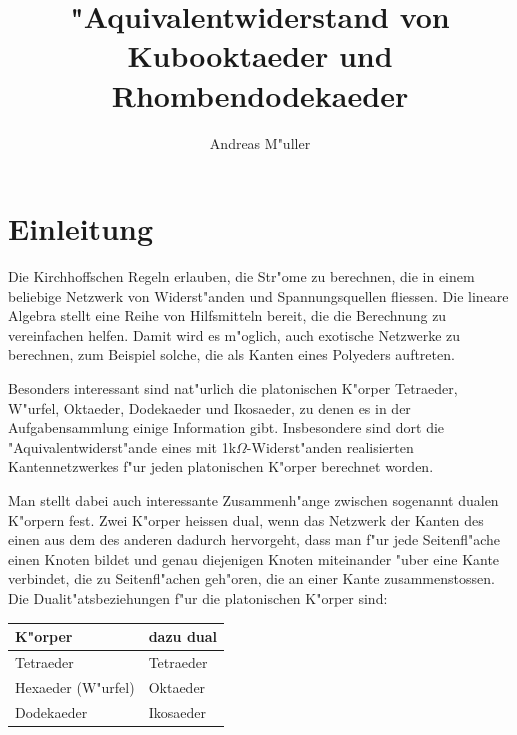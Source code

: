 \documentclass[a4paper,12pt]{article}
\begin{document}
\title{"Aquivalentwiderstand von Kubooktaeder und Rhombendodekaeder}
\author{Andreas M"uller}
\date{}
\maketitle
\section{Einleitung}
Die Kirchhoffschen Regeln erlauben, die Str"ome zu berechnen,
die in einem beliebige Netzwerk von Widerst"anden und Spannungsquellen fliessen.
Die lineare Algebra stellt eine Reihe von Hilfsmitteln bereit, die
die Berechnung zu vereinfachen helfen.
Damit wird es m"oglich, auch exotische Netzwerke zu berechnen, zum Beispiel
solche, die als Kanten eines Polyeders auftreten.

Besonders interessant sind nat"urlich die platonischen K"orper Tetraeder, W"urfel,
Oktaeder, Dodekaeder und Ikosaeder, zu denen es in der Aufgabensammlung
einige Information gibt.
Insbesondere sind dort die "Aquivalentwiderst"ande eines mit
1k$\Omega$-Widerst"anden realisierten Kantennetzwerkes f"ur jeden 
platonischen K"orper berechnet worden.

Man stellt dabei auch interessante Zusammenh"ange zwischen sogenannt dualen
K"orpern fest.
Zwei K"orper heissen dual, wenn das Netzwerk der Kanten des einen aus dem des anderen
dadurch hervorgeht, dass man f"ur jede Seitenfl"ache einen Knoten bildet
und genau diejenigen Knoten miteinander "uber eine Kante verbindet, die zu
Seitenfl"achen geh"oren, die an einer Kante zusammenstossen.
Die Dualit"atsbeziehungen f"ur die platonischen K"orper sind:
\begin{center}
\begin{tabular}{ll}
\hline
K"orper&dazu dual\\
\hline
Tetraeder&Tetraeder\\
Hexaeder (W"urfel)&Oktaeder\\
Dodekaeder&Ikosaeder\\
\hline
\end{tabular}
\end{center}
\end{document}
